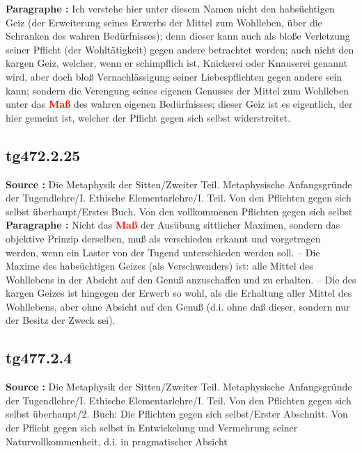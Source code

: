 \documentclass[a4paper,12pt,twoside]{book}
\newcommand{\match}[1]{\textcolor{red}{\textbf{#1}}}
\begin{document}
	\textbf{Paragraphe : }Ich verstehe hier unter diesem Namen nicht den habsüchtigen Geiz (der Erweiterung seines Erwerbs der Mittel zum Wohlleben, über die Schranken des wahren Bedürfnisses); denn dieser kann auch als bloße Verletzung seiner Pflicht (der Wohltätigkeit) gegen andere betrachtet werden;  auch nicht den kargen Geiz, welcher, wenn er schimpflich ist, Knickerei oder Knauserei genannt wird, aber doch bloß Vernachlässigung seiner Liebespflichten gegen andere sein kann; sondern die Verengung seines eigenen Genusses der Mittel zum Wohlleben unter das \match{Maß} des wahren eigenen Bedürfnisses; dieser Geiz ist es eigentlich, der hier gemeint ist, welcher der Pflicht gegen sich selbst widerstreitet. 
	
	\subsection*{tg472.2.25} 
	\textbf{Source : }Die Metaphysik der Sitten/Zweiter Teil. Metaphysische Anfangsgründe der Tugendlehre/I. Ethische Elementarlehre/I. Teil. Von den Pflichten gegen sich selbst überhaupt/Erstes Buch. Von den vollkommenen Pflichten gegen sich selbst\\  
	
	\textbf{Paragraphe : }Nicht das \match{Maß} der Ausübung sittlicher Maximen, sondern das objektive Prinzip derselben, muß als verschieden erkannt und vorgetragen werden, wenn ein Laster von der Tugend unterschieden werden soll. – Die Maxime des habsüchtigen Geizes (als Verschwenders) ist: alle Mittel des Wohllebens in der Absicht auf den Genuß anzuschaffen und zu erhalten. – Die des kargen Geizes ist hingegen der Erwerb so wohl, als die Erhaltung aller Mittel des Wohllebens, aber ohne Absicht auf den Genuß (d.i. ohne daß dieser, sondern nur der Besitz der Zweck sei). 
	
	\subsection*{tg477.2.4} 
	\textbf{Source : }Die Metaphysik der Sitten/Zweiter Teil. Metaphysische Anfangsgründe der Tugendlehre/I. Ethische Elementarlehre/I. Teil. Von den Pflichten gegen sich selbst überhaupt/2. Buch: Die Pflichten gegen sich selbst/Erster Abschnitt. Von der Pflicht gegen sich selbst in Entwickelung und Vermehrung seiner Naturvollkommenheit, d.i. in pragmatischer Absicht\\  
	
\end{document}
